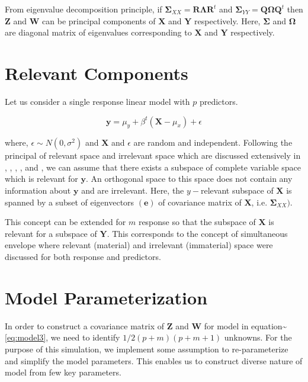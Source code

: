 \documentclass[12pt,A4paper,authoryear]{elsarticle} %
\begin{document}
From eigenvalue decomposition principle, if
\(\boldsymbol{\Sigma}_{XX} = \mathbf{R}\boldsymbol{\Lambda}\mathbf{R}^t\)
and
\(\boldsymbol{\Sigma}_{YY} = \mathbf{Q}\boldsymbol{\Omega}\mathbf{Q}^t\)
then \(\mathbf{Z}\) and \(\mathbf{W}\) can be principal components of
\(\mathbf{X}\) and \(\mathbf{Y}\) respectively. Here,
\(\boldsymbol{\Sigma}\) and \(\boldsymbol{\Omega}\) are diagonal matrix
of eigenvalues corresponding to \(\mathbf{X}\) and \(\mathbf{Y}\)
respectively.

\section{Relevant Components}\label{relevant-components}

Let us consider a single response linear model with \(p\) predictors.

\[\mathbf{y} = \mu_y + \beta^t\left(\mathbf{X} - \mu_x\right) + \epsilon\]

where, \(\epsilon \sim N(0, \sigma^2)\) and \(\mathbf{X}\) and
\(\epsilon\) are random and independent. Following the principal of
relevant space and irrelevant space which are discussed extensively in
\citet{helland1994comparison}, \citet{Helland_2000},
\citet{helland2012near}, \citet{cook2013envelopes},
\citet{saebo2015simrel} and \citet{helland2017}, we can assume that
there exists a subspace of complete variable space which is relevant for
\(\mathbf{y}\). An orthogonal space to this space does not contain any
information about \(\mathbf{y}\) and are irrelevant. Here, the
\(y-\)relevant subspace of \(\mathbf{X}\) is spanned by a subset of
eigenvectors \(\mathbf{(e)}\) of covariance matrix of \(\mathbf{X}\),
i.e. \(\boldsymbol{\Sigma}_{XX})\).

This concept can be extended for \(m\) response so that the subspace of
\(\mathbf{X}\) is relevant for a subspace of \(\mathbf{Y}\). This
corresponds to the concept of simultaneous envelope \citep{Cook_2014}
where relevant (material) and irrelevant (immaterial) space were
discussed for both response and predictors.

\section{Model Parameterization}\label{model-parameterization}

In order to construct a covariance matrix of \(\mathbf{Z}\) and
\(\mathbf{W}\) for model in equation\textasciitilde{}\eqref{eq:model3}, we
need to identify \(1/2 (p+m)(p+m+1)\) unknowns. For the purpose of this
simulation, we implement some assumption to re-parameterize and simplify
the model parameters. This enables us to construct diverse nature of
model from few key parameters.
\end{document}
